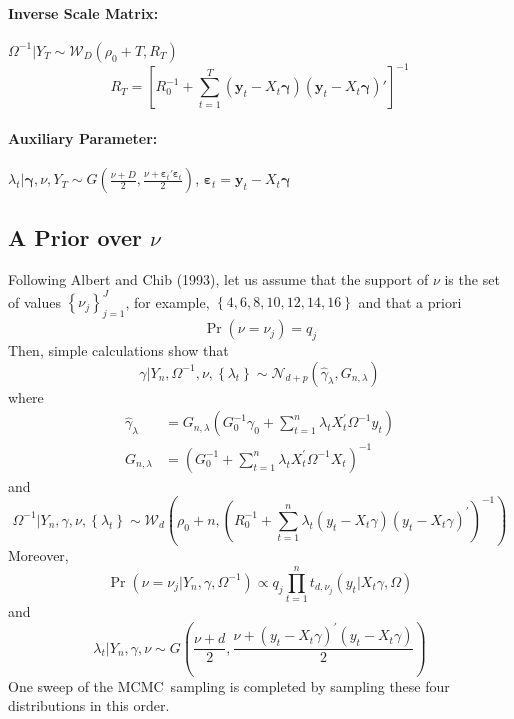 \documentclass[12pt]{article}
\begin{document}
\paragraph{Inverse Scale Matrix:}
$\Omega^{-1}|Y_T \sim \mathcal{W}_D\left(\rho_0 + T, R_T \right)$
\begin{equation*}
  R_T = \left[ R_0^{-1} + \sum_{t=1}^{T} \left( \mathbf{y}_t - X_t \boldsymbol{\gamma} \right)\left( \mathbf{y}_t - X_t \boldsymbol{\gamma} \right)' \right]^{-1}
\end{equation*}

\paragraph{Auxiliary Parameter:} $\lambda_t|\boldsymbol{\gamma}, \nu, Y_T \sim G\left(\displaystyle \frac{\nu + D}{2}, \frac{\nu + \boldsymbol{\varepsilon}_t' \boldsymbol{\varepsilon}_t}{2} \right)$, $\boldsymbol{\varepsilon}_t = \mathbf{y}_t - X_t \boldsymbol{\gamma}$

\subsection{A Prior over $\nu$}
Following Albert and Chib (1993), let us assume that the support of $\nu $
is the set of values $\left\{ \nu _{j}\right\} _{j=1}^{J}$, for example, $%
\left\{ 4,6,8,10,12,14,16\right\} $ and that a priori
\begin{equation*}
\Pr \left( \nu =\nu _{j}\right) =q_{j}
\end{equation*}%
Then, simple calculations show that
\begin{equation*}
\gamma |Y_{n},\Omega ^{-1},\nu ,\left\{ \lambda _{t}\right\} \sim \mathcal{N}%
_{d+p}\left( \hat{\gamma}_{\lambda },G_{n,\lambda }\right)
\end{equation*}%
where
\begin{align*}
\hat{\gamma}_{\lambda }& =G_{n,\lambda }\left( G_{0}^{-1}\gamma
_{0}+\sum_{t=1}^{n}\lambda _{t}X_{t}^{\prime }\Omega ^{-1}y_{t}\right)  \\
G_{n,\lambda }& =\left( G_{0}^{-1}+\sum_{t=1}^{n}\lambda _{t}X_{t}^{\prime
}\Omega ^{-1}X_{t}\right) ^{-1}
\end{align*}%
and
\begin{equation*}
\Omega ^{-1}|Y_{n},\gamma ,\nu ,\left\{ \lambda _{t}\right\} \sim \mathcal{W}%
_{d}\left( \rho _{0}+n,\left( R_{0}^{-1}+\sum_{t=1}^{n}\lambda _{t}\left(
y_{t}-X_{t}\gamma \right) \left( y_{t}-X_{t}\gamma \right) ^{\prime }\right)
^{-1}\right)
\end{equation*}%
Moreover,%
\begin{equation*}
\Pr \left( \nu =\nu _{j}|Y_{n},\gamma ,\Omega ^{-1}\right) \propto
q_{j}\prod\limits_{t=1}^{n}t_{d,\nu _{j}}\left( y_{t}|X_{t}\gamma ,\Omega
\right)
\end{equation*}%
and%
\begin{equation*}
\lambda _{t}|Y_{n},\gamma ,\nu \sim G\left( \frac{\nu +d}{2},\frac{\nu
+\left( y_{t}-X_{t}\gamma \right) ^{\prime }\left( y_{t}-X_{t}\gamma \right)
}{2}\right)
\end{equation*}%
One sweep of the MCMC\ sampling is completed by sampling these four
distributions in this order.
\end{document}
